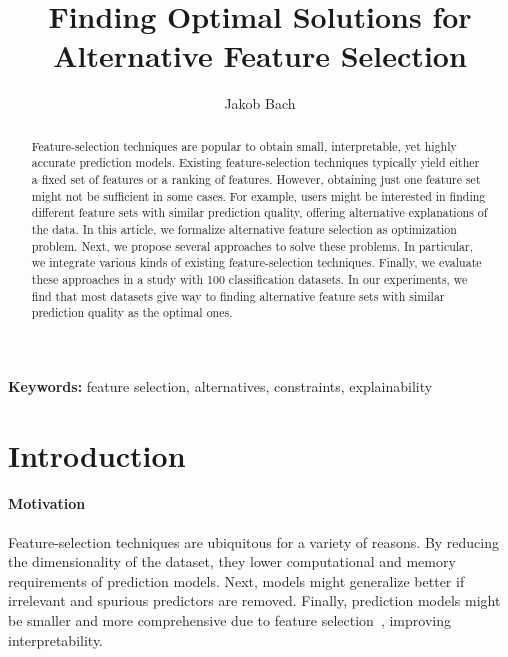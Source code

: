 \documentclass{article}
\title{Finding Optimal Solutions for Alternative Feature Selection}
\author{Jakob Bach}
\theoremstyle{definition}
\begin{document}
\maketitle

\begin{abstract}
Feature-selection techniques are popular to obtain small, interpretable, yet highly accurate prediction models.
Existing feature-selection techniques typically yield either a fixed set of features or a ranking of features.
However, obtaining just one feature set might not be sufficient in some cases.
For example, users might be interested in finding different feature sets with similar prediction quality, offering alternative explanations of the data.
In this article, we formalize alternative feature selection as optimization problem.
Next, we propose several approaches to solve these problems.
In particular, we integrate various kinds of existing feature-selection techniques.
Finally, we evaluate these approaches in a study with 100 classification datasets.
In our experiments, we find that most datasets give way to finding alternative feature sets with similar prediction quality as the optimal ones.
\end{abstract}

\textbf{Keywords:} feature selection, alternatives, constraints, explainability

\section{Introduction}
\label{sec:introduction}

\paragraph{Motivation}

Feature-selection techniques are ubiquitous for a variety of reasons.
By reducing the dimensionality of the dataset, they lower computational and memory requirements of prediction models.
Next, models might generalize better if irrelevant and spurious predictors are removed.
Finally, prediction models might be smaller and more comprehensive due to feature selection~\cite{li2017feature}, improving interpretability.
\end{document}
